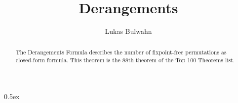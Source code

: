 \documentclass[11pt,a4paper]{article}
\begin{document}
\title{Derangements}
\author{Lukas Bulwahn}
\maketitle

\begin{abstract}
The Derangements Formula describes the number of fixpoint-free permutations
as closed-form formula. This theorem is the 88th theorem of the Top 100
Theorems list.
\end{abstract}
\tableofcontents

\parindent 0pt\parskip 0.5ex



\nocite{Harrison,wikipedia:derangement,wikipedia:fixpunktfreie-permutation,wikipedia:rencontres-numbers}




\end{document}
